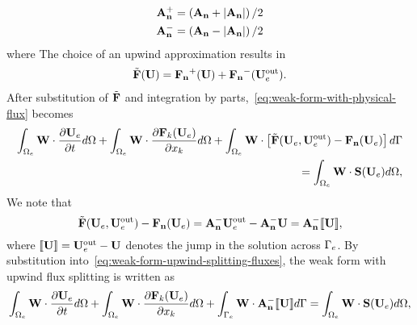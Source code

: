 \begin{align}
  \label{eq:AnMinus-AnPlus-Definition}
\mathbf{A}_\mathbf{n}^{+} &= \left( \mathbf{A}_\mathbf{n} + \left| \mathbf{A}_\mathbf{n} \right| \right) / 2   \\
\mathbf{A}_\mathbf{n}^{-} &= \left( \mathbf{A}_\mathbf{n} - \left| \mathbf{A}_\mathbf{n} \right| \right) / 2
\end{align}
where %
The choice of an upwind approximation results in
\begin{align}
\tilde{\mathbf{F}}(\mathbf{U}) = \mathbf{\mathbf{F}_n}^+(\mathbf{U}) + \mathbf{\mathbf{F}_n}^-(\mathbf{U}_e^{\textrm{out}}).
\label{eq:num-flux-splitting}
\end{align}
After substitution of $\tilde{\mathbf{F}}$ and integration by parts,~\eqref{eq:weak-form-with-physical-flux} becomes
\begin{align*}
\int_{\Omega_e} \mathbf{W} \cdot \frac{\partial \mathbf{U}_e}{\partial t} d\Omega  + \int_{\Omega_e} \mathbf{W} \cdot \frac{\partial \mathbf{F}_{k}(\mathbf{U}_e)}{\partial x_{k}} d\Omega + \int_{\Omega_e} \mathbf{W} \cdot \left[ \tilde{\mathbf{F}}(\mathbf{U}_e,\mathbf{U}_e^{\textrm{out}}) - \mathbf{\mathbf{F}_n}(\mathbf{U}_e) \right] d\Gamma \\
= \int_{\Omega_e} \mathbf{W}  \cdot \mathbf{S}(\mathbf{U}_e) d\Omega, \label{eq:weak-form-upwind-splitting-fluxes}
\end{align*}
We note that %
\begin{equation}
  \tilde{\mathbf{F}}(\mathbf{U}_e,\mathbf{U}_e^{\textrm{out}}) - \mathbf{\mathbf{F}_n}(\mathbf{U}_e) = \mathbf{A}_\mathbf{n}^{-} \mathbf{U}_e^{\textrm{out}} - \mathbf{A}_\mathbf{n}^{-} \mathbf{U} = \mathbf{A}_\mathbf{n}^{-} \llbracket \mathbf{U} \rrbracket, \label{eq:AnMinusUderivation}
\end{equation}
where $\llbracket \mathbf{U} \rrbracket = \mathbf{U}_e^{\textrm{out}} - \mathbf{U}$ denotes the jump in the solution across $\Gamma_e$. By substitution into~\eqref{eq:weak-form-upwind-splitting-fluxes}, the weak form with upwind flux splitting is written as
\begin{equation}
\int_{\Omega_e} \mathbf{W} \cdot \frac{\partial \mathbf{U}_e}{\partial t} d\Omega  + \int_{\Omega_e} \mathbf{W} \cdot \frac{\partial \mathbf{F}_{k}(\mathbf{U}_e)}{\partial x_{k}} d\Omega + \int_{\Gamma_e} \mathbf{W} \cdot \mathbf{A}_\mathbf{n}^{-} \llbracket \mathbf{U} \rrbracket d\Gamma = \int_{\Omega_e} \mathbf{W}  \cdot \mathbf{S}(\mathbf{U}_e) d\Omega,
\label{eq:weak-form-final}
\end{equation}


